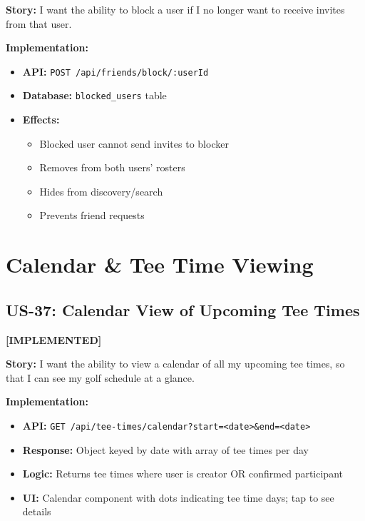 \documentclass[11pt,a4paper]{article}
\newcommand{\implemented}{\textcolor{implemented}{\textbf{[IMPLEMENTED]}}}
\begin{document}
\textbf{Story:} I want the ability to block a user if I no longer want to receive invites from that user.

\textbf{Implementation:}
\begin{itemize}[leftmargin=*]
  \item \textbf{API:} \texttt{POST /api/friends/block/:userId}
  \item \textbf{Database:} \texttt{blocked\_users} table
  \item \textbf{Effects:}
    \begin{itemize}
      \item Blocked user cannot send invites to blocker
      \item Removes from both users' rosters
      \item Hides from discovery/search
      \item Prevents friend requests
    \end{itemize}
\end{itemize}


\section{Calendar \& Tee Time Viewing}

\subsection{US-37: Calendar View of Upcoming Tee Times}
\implemented

\textbf{Story:} I want the ability to view a calendar of all my upcoming tee times, so that I can see my golf schedule at a glance.

\textbf{Implementation:}
\begin{itemize}[leftmargin=*]
  \item \textbf{API:} \texttt{GET /api/tee-times/calendar?start=<date>\&end=<date>}
  \item \textbf{Response:} Object keyed by date with array of tee times per day
  \item \textbf{Logic:} Returns tee times where user is creator OR confirmed participant
  \item \textbf{UI:} Calendar component with dots indicating tee time days; tap to see details
\end{itemize}
\end{document}
